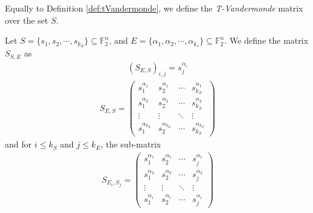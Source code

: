 \documentclass[11pt]{llncs}
\begin{document}
Equally to Definition \ref{def:tVandermonde}, we define the \textit{T-Vandermonde} matrix over the set $S$.
\begin{definition}
    Let $S = \{s_1, s_2, \cdots, s_{k_S}\} \subseteq \mathbb{F}_2^n$, and $E = \{\alpha_1, \alpha_2, \cdots, \alpha_{k_s}\} \subseteq \mathbb{F}_2^n$. We define the matrix $S_{S,E}$ as
    \begin{align*}
        \left(S_{E,S}\right)_{i,j} = s_j^{\alpha_i}
    \end{align*}
    \begin{align*}
        S_{E,S} = 
        \begin{pmatrix}
            s_1^{\alpha_1} & s_2^{\alpha_1} & \cdots & s_{k_S}^{\alpha_1} \\
            s_1^{\alpha_2} & s_2^{\alpha_2} & \cdots & s_{k_S}^{\alpha_2} \\
            \vdots & \vdots & \ddots & \vdots \\
            s_1^{\alpha_{k_E}} & s_{2}^{\alpha_{k_E}} & \cdots & s_{k_S}^{\alpha_{k_E}}
        \end{pmatrix}
    \end{align*}
    and for $i \leq k_S$ and $j\leq k_E$, the sub-matrix
    \begin{align*}
    S_{E_i, S_j} = 
    \begin{pmatrix}
            s_1^{\alpha_1} & s_2^{\alpha_1} & \cdots & s_{j}^{\alpha_1} \\
            s_1^{\alpha_2} & s_2^{\alpha_2} & \cdots & s_{j}^{\alpha_2} \\
            \vdots & \vdots & \ddots & \vdots \\
            s_1^{\alpha_{i}} & s_{2}^{\alpha_{i}} & \cdots & s_{j}^{\alpha_{i}}
        \end{pmatrix}    
    \end{align*}
\end{definition}
\end{document}
